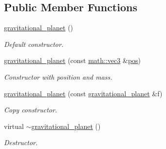 \subsection*{Public Member Functions}
\begin{DoxyCompactItemize}
\item 
\mbox{\label{classphysim_1_1fields_1_1gravitational__planet_a9c225658e7538b0b62cb3e5647dfc172}} 
\hyperlink{classphysim_1_1fields_1_1gravitational__planet_a9c225658e7538b0b62cb3e5647dfc172}{gravitational\+\_\+planet} ()
\begin{DoxyCompactList}\small\item\em Default constructor. \end{DoxyCompactList}\item 
\mbox{\label{classphysim_1_1fields_1_1gravitational__planet_adf2de01f520960fe939e0943cfa3871e}} 
\hyperlink{classphysim_1_1fields_1_1gravitational__planet_adf2de01f520960fe939e0943cfa3871e}{gravitational\+\_\+planet} (const \hyperlink{structphysim_1_1math_1_1vec3}{math\+::vec3} \&\hyperlink{classphysim_1_1fields_1_1punctual_a00344d6f3e4f3f841e7d876918c66977}{pos})
\begin{DoxyCompactList}\small\item\em Constructor with position and mass. \end{DoxyCompactList}\item 
\mbox{\label{classphysim_1_1fields_1_1gravitational__planet_a7e1ac5ee386422f3b02129cac5c17b4d}} 
\hyperlink{classphysim_1_1fields_1_1gravitational__planet_a7e1ac5ee386422f3b02129cac5c17b4d}{gravitational\+\_\+planet} (const \hyperlink{classphysim_1_1fields_1_1gravitational__planet}{gravitational\+\_\+planet} \&f)
\begin{DoxyCompactList}\small\item\em Copy constructor. \end{DoxyCompactList}\item 
\mbox{\label{classphysim_1_1fields_1_1gravitational__planet_a9384cf122e83c63992c000b221b9fb96}} 
virtual \hyperlink{classphysim_1_1fields_1_1gravitational__planet_a9384cf122e83c63992c000b221b9fb96}{$\sim$gravitational\+\_\+planet} ()
\begin{DoxyCompactList}\small\item\em Destructor. \end{DoxyCompactList}\item 

\end{DoxyCompactItemize}

